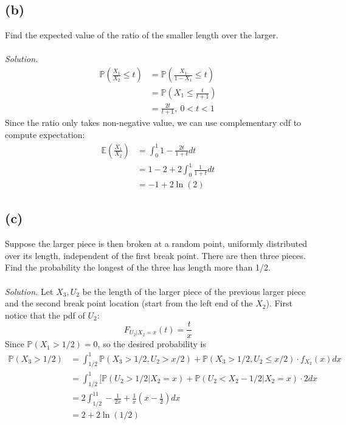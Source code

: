\documentclass{article}
\newcommand{\prob}{\mathbb{P}}
\newcommand{\E}{\mathbb{E}}
\begin{document}
\subsection*{(b)}
Find the expected value of the ratio of the smaller length over the larger.
\color{blue}
\\\\\textit{Solution. }
\begin{equation*}
    \begin{split}
        \prob(\frac{X_1}{X_2}\leq t) &=\prob(\frac{X_1}{1-X_1}\leq t)\\
        &= \prob(X_1\leq \frac{t}{t+1})\\
        &= \frac{2t}{t+1},\ 0<t<1
    \end{split}
\end{equation*}
Since the ratio only takes non-negative value, we can use complementary cdf to compute expectation:
\begin{equation*}
    \begin{split}
        \E\left(\frac{X_1}{X_2}\right) &= \int_0^1 1-\frac{2t}{1+t}dt\\
        &=1-2+2\int_0^1\frac{1}{1+t}dt\\
        &=-1+2\ln(2)
    \end{split}
\end{equation*}
\color{black}
\subsection*{(c)}
Suppose the larger piece is then broken at a random point, uniformly distributed over its length, independent of the first break point. There are then three pieces. Find the probability the longest of the three has length more than 1/2.
\color{blue}
\\\\\textit{Solution. }Let $X_3, U_2$ be the length of the larger piece of the previous larger piece and the second break point location (start from the left end of the $X_2$). First notice that the pdf of $U_2$:
$$F_{U_2|X_2=x}(t) = \frac{t}{x}$$
Since $\prob(X_1>1/2)=0$, so the desired probability is
\begin{equation*}
    \begin{split}
        \prob(X_3>1/2) &= \int_{1/2}^1\prob(X_3>1/2,U_2>x/2)+\prob(X_3>1/2,U_2\leq x/2)\cdot f_{X_2}(x)dx\\
        &= \int_{1/2}^1[\prob(U_2>1/2\vert X_2=x)+\prob(U_2<X_2-1/2\vert X_2=x)\cdot 2 dx\\
        &= 2 \int_{1/2}^11-\frac{1}{2x}+\frac{1}{x}(x- \frac{1}{2}) dx\\
        &= 2+2\ln(1/2)
    \end{split}
\end{equation*}
\end{document}
